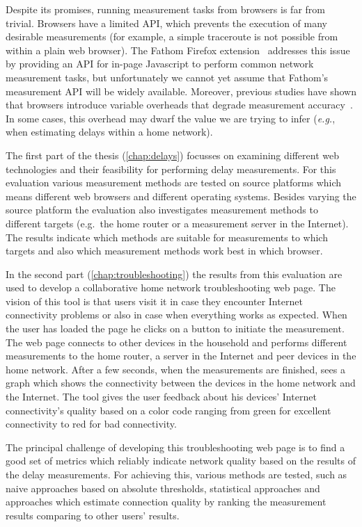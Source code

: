 \documentclass[12pt,twoside]{book}
\begin{document}
Despite its promises, running measurement tasks from browsers is far from trivial. Browsers have a limited API, which prevents the execution of many desirable measurements (for example, a simple traceroute is not possible from within a plain web browser). The Fathom Firefox extension~\cite{fathom} addresses this issue by providing an API for in-page Javascript to perform common network measurement tasks, but unfortunately we cannot yet assume that Fathom's measurement API will be widely available. Moreover, 
previous studies have shown that browsers introduce variable overheads that degrade measurement accuracy~\cite{li:imc2013}. In some cases, this overhead may dwarf the value we are trying to infer (\textit{e.g.}, when estimating delays within a home network).

The first part of the thesis (\autoref{chap:delays}) focusses on examining different web technologies and their feasibility for performing delay measurements. For this evaluation various measurement methods are tested on source platforms which means different web browsers and different operating systems. Besides varying the source platform the evaluation also investigates measurement methods to different targets (e.g.~the home router or a measurement server in the Internet). The results indicate which methods are suitable for measurements to which targets and also which measurement methods work best in which browser. 

In the second part (\autoref{chap:troubleshooting}) the results from this evaluation are used to develop a collaborative home network troubleshooting web page. The vision of this tool is that users visit it in case they encounter Internet connectivity problems or also in case when everything works as expected. When the user has loaded the page he clicks on a button to initiate the measurement. The web page connects to other devices in the household and performs different measurements to the home router, a server in the Internet and peer devices in the home network. After a few seconds, when the measurements are finished, sees a graph which shows the connectivity between the devices in the home network and the Internet. The tool gives the user feedback about his devices' Internet connectivity's quality based on a color code ranging from green for excellent connectivity to red for bad connectivity. 

The principal challenge of developing this troubleshooting web page is to find a good set of metrics which reliably indicate network quality based on the results of the delay measurements. For achieving this, various methods are tested, such as naive approaches based on absolute thresholds, statistical approaches and approaches which estimate connection quality by ranking the measurement results comparing to other users' results. 
\end{document}
